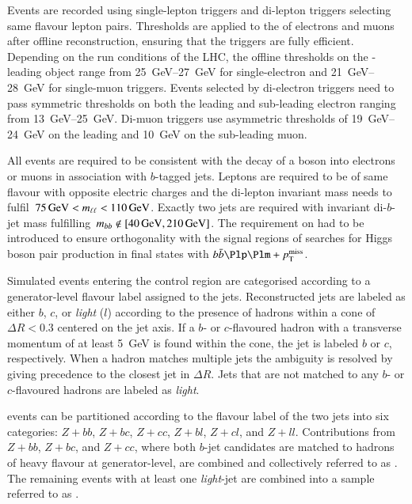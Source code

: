 Events are recorded using single-lepton triggers and di-lepton
triggers selecting same flavour lepton pairs. Thresholds are applied
to the \pT of electrons and muons after offline reconstruction,
ensuring that the triggers are fully efficient. Depending on the run
conditions of the LHC, the offline thresholds on the \pT-leading
object range from \SIrange{25}{27}{\GeV} for single-electron and
\SIrange{21}{28}{\GeV} for single-muon triggers. Events selected by
di-electron triggers need to pass symmetric \pT thresholds on both the
leading and sub-leading electron ranging from
\SIrange{13}{25}{\GeV}. Di-muon triggers use asymmetric thresholds of
\SIrange{19}{24}{\GeV} on the leading and \SI{10}{\GeV} on the
sub-leading muon.

All events are required to be consistent with the decay of a \PZ boson
into electrons or muons in association with $b$-tagged jets. Leptons
are required to be of same flavour with opposite electric charges and
the di-lepton invariant mass needs to
fulfil~$\SI{75}{\ensuremath{\text{GeV}}} < m_{\ell\ell} < \SI{110}{\ensuremath{\text{GeV}}}$. Exactly two \btagged
jets are required with invariant di-$b$-jet mass
fulfilling~$\mBB \not\in [\SI{40}{\GeV}, \SI{210}{\GeV}]$. The
requirement on \mBB had to be introduced to ensure orthogonality with
the signal regions of searches for Higgs boson pair production in
final states with $\bbbar\Plp\Plm + \pTmissAbs$.

Simulated \Zjets events entering the \ZHF control region are
categorised according to a generator-level flavour label assigned to
the \btagged jets. Reconstructed jets are labeled as either $b$, $c$,
or \emph{light} ($l$) according to the presence of hadrons within a
cone of $\Delta R < 0.3$ centered on the jet axis. If a $b$- or
$c$-flavoured hadron with a transverse momentum of at least
\SI{5}{\GeV} is found within the cone, the jet is labeled $b$ or $c$,
respectively. When a hadron matches multiple jets the ambiguity is
resolved by giving precedence to the closest jet in $\Delta R$. Jets
that are not matched to any $b$- or $c$-flavoured hadrons are labeled
as \emph{light}.

\Zjets events can be partitioned according to the flavour label of the
two \btagged jets into six categories: $Z + bb$, $Z + bc$, $Z + cc$,
$Z + bl$, $Z + cl$, and $Z + ll$. Contributions from $Z + bb$,
$Z + bc$, and $Z + cc$, where both $b$-jet candidates are matched to
hadrons of heavy flavour at generator-level, are combined and
collectively referred to as \ZHF. The remaining \Zjets events with at
least one \emph{light}-jet are combined into a sample referred to as
\ZLF.


